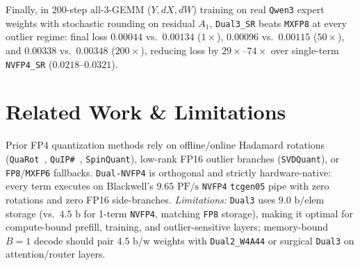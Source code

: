 \documentclass[conference,10pt]{IEEEtran}
\begin{document}
\begin{table}[t]
\centering
\caption{All-48-Layer Real \texttt{Qwen3-30B-A3B} Forward Pass Audit vs.\ \texttt{BF16}.}
\label{tab:48l}
\end{table}

Finally, in 200-step all-3-GEMM ($Y, dX, dW$) training on real \texttt{Qwen3} expert weights with stochastic rounding on residual $A_1$, \texttt{Dual3\_SR} beats \texttt{MXFP8} at every outlier regime: final loss $0.00044$ vs.\ $0.00134$ ($1\times$), $0.00096$ vs.\ $0.00115$ ($50\times$), and $0.00338$ vs.\ $0.00348$ ($200\times$), reducing loss by $29\times$--$74\times$ over single-term \texttt{NVFP4\_SR} ($0.0218$--$0.0321$).

\section{Related Work \& Limitations}
Prior FP4 quantization methods rely on offline/online Hadamard rotations (\texttt{QuaRot}~\cite{ashkboos2024quarot}, \texttt{QuIP\#}~\cite{tseng2024quip}, \texttt{SpinQuant}), low-rank FP16 outlier branches (\texttt{SVDQuant}), or \texttt{FP8}/\texttt{MXFP6} fallbacks. \texttt{Dual-NVFP4} is orthogonal and strictly hardware-native: every term executes on Blackwell's $9.65\text{ PF/s}$ \texttt{NVFP4} \texttt{tcgen05} pipe with zero rotations and zero FP16 side-branches. \emph{Limitations:} \texttt{Dual3} uses $9.0\text{ b/elem}$ storage (vs.\ $4.5\text{ b}$ for 1-term \texttt{NVFP4}, matching \texttt{FP8} storage), making it optimal for compute-bound prefill, training, and outlier-sensitive layers; memory-bound $B{=}1$ decode should pair $4.5\text{ b/w}$ weights with \texttt{Dual2\_W4A44} or surgical \texttt{Dual3} on attention/router layers.
\end{document}
